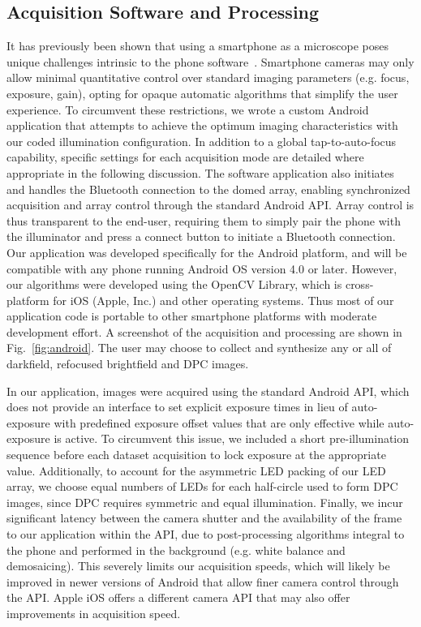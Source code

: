 \subsection{Acquisition Software and Processing}
It has previously been shown that using a smartphone as a microscope poses unique challenges intrinsic to the phone software~\cite{skandarajah2014quantitative}. Smartphone cameras may only allow minimal quantitative control over standard imaging parameters (e.g. focus, exposure, gain), opting for opaque automatic algorithms that simplify the user experience. To circumvent these restrictions, we wrote a custom Android application that attempts to achieve the optimum imaging characteristics with our coded illumination configuration. In addition to a global tap-to-auto-focus capability, specific settings for each acquisition mode are detailed where appropriate in the following discussion. The software application also initiates and handles the Bluetooth connection to the domed array, enabling synchronized acquisition and array control through the standard Android API. Array control is thus transparent to the end-user, requiring them to simply pair the phone with the illuminator and press a connect button to initiate a Bluetooth connection. Our application was developed specifically for the Android platform, and will be compatible with any phone running Android OS version 4.0 or later. However, our algorithms were developed using the OpenCV Library, which is cross-platform for iOS (Apple, Inc.) and other operating systems. Thus most of our application code is portable to other smartphone platforms with moderate development effort. A screenshot of the acquisition and processing are shown in Fig.~\ref{fig:android}. The user may choose to collect and synthesize any or all of darkfield, refocused brightfield and DPC images.

In our application, images were acquired using the standard Android API, which does not provide an interface to set explicit exposure times in lieu of auto-exposure with predefined exposure offset values that are only effective while auto-exposure is active. To circumvent this issue, we included a short pre-illumination sequence before each dataset acquisition to lock exposure at the appropriate value. Additionally, to account for the asymmetric LED packing of our LED array, we choose equal numbers of LEDs for each half-circle used to form DPC images, since DPC requires symmetric and equal illumination. Finally, we incur significant latency between the camera shutter and the availability of the frame to our application within the API, due to post-processing algorithms integral to the phone and performed in the background (e.g. white balance and demosaicing). This severely limits our acquisition speeds, which will likely be improved in newer versions of Android that allow finer camera control through the API. Apple iOS offers a different camera API that may also offer improvements in acquisition speed.


